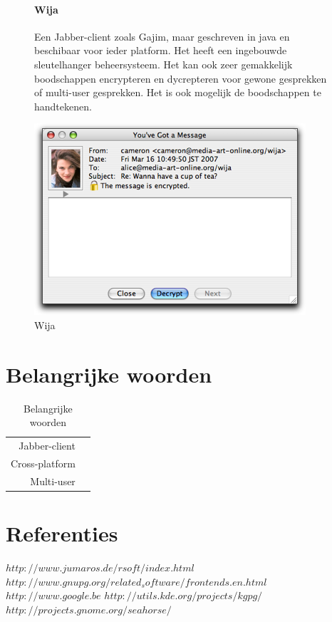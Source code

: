 \documentclass[12pt]{article}
\begin{document}
				\begin{figure}[!ht]
					\paragraph{Wija}
						Een Jabber-client zoals Gajim, maar geschreven in java en beschibaar voor 								ieder platform.
						Het heeft een ingebouwde sleutelhanger beheersysteem. Het kan ook zeer 									gemakkelijk boodschappen encrypteren en dycrepteren voor gewone gesprekken of 							multi-user gesprekken.
						Het is ook mogelijk de boodschappen te handtekenen.
					\begin{center}
						\includegraphics[scale=0.7]{Pictures/wija}
					\end{center}
					\caption{Wija}
				\end{figure}
						
		\section{Belangrijke woorden}\label{Belangrijke woorden}
			\begin{table}[!ht]
				\begin{center}
					\begin{tabular}{r|l}
						Jabber-client		&	\\
						Cross-platform		&	\\
						Multi-user			&	\\
					\end{tabular}
				\end{center}
				\caption{Belangrijke woorden}
			\end{table}

		\newpage
		\section{Referenties}\label{Referenties}
			$http://www.jumaros.de/rsoft/index.html$ \\
			$http://www.gnupg.org/related_software/frontends.en.html$ \\
			$http://www.google.be$
			$http://utils.kde.org/projects/kgpg/$
			$http://projects.gnome.org/seahorse/$
					
	
	
\end{document}

